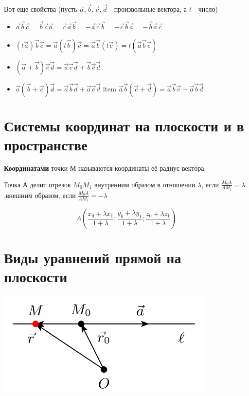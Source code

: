 \documentclass[a4paper]{article}
\begin{document}
Вот еще свойства (пусть $\vec{a}, \vec{b}, \vec{c}, \vec{d}$ - произвольные вектора, а $t$ - число)
\begin{itemize}
\item $\vec{a} \vec{b} \vec{c} = \vec{b} \vec{c} \vec{a} = \vec{c} \vec{a} \vec{b} = -\vec{a} \vec{c} \vec{b} = -\vec{c} \vec{b} \vec{a} = -\vec{b} \vec{a} \vec{c}$
\item $(t\vec{a}) \vec{b} \vec{c} = \vec{a} (t \vec{b}) \vec{c} = \vec{a} \vec{b} (t \vec{c}) = t (\vec{a} \vec{b} \vec{c})$
\item $(\vec{a} + \vec{b}) \vec{c} \vec{d} = \vec{a} \vec{c} \vec{d} + \vec{b} \vec{c} \vec{d} $
\item $\vec{a} (\vec{b} + \vec{c}) \vec{d} = \vec{a} \vec{b} \vec{d} + \vec{a} \vec{c} \vec{d}$
item $\vec{a} \vec{b} (\vec{c} + \vec{d}) = \vec{a} \vec{b} \vec{c} + \vec{a} \vec{b} \vec{d}$
\end{itemize}


\section*{Системы координат на плоскости и в пространстве}
\textbf{Координатами} точки М называются координаты её радиус-вектора.

Точка А делит отрезок $M_0 M_1$ внутренним образом в отношении $\lambda$, если $\displaystyle \frac{M_0 A}{A M_1} = \lambda$,\newline внешним образом, если $\displaystyle \frac{M_0 A}{A M_1} = -\lambda$

\begin{equation}
\displaystyle A \left( \frac{x_0 + \lambda x_1}{1 + \lambda}; \frac{y_0 + \lambda y_1}{1 + \lambda}; \frac{z_0 + \lambda z_1}{1+\lambda}\right)
\end{equation}



\section*{Виды уравнений прямой на плоскости}

\includegraphics[width=11cm]{t6}
\end{document}
